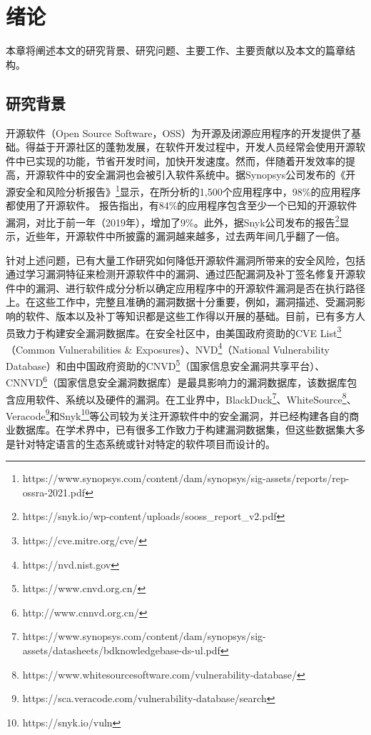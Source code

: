 \chapter{绪论}

本章将阐述本文的研究背景、研究问题、主要工作、主要贡献以及本文的篇章结构。

\section{研究背景}

开源软件（Open Source Software，OSS）为开源及闭源应用程序的开发提供了基础。得益于开源社区的蓬勃发展，在软件开发过程中，开发人员经常会使用开源软件中已实现的功能，节省开发时间，加快开发速度\cite{Wang2020empirical}。然而，伴随着开发效率的提高，开源软件中的安全漏洞也会被引入软件系统中\cite{2何熙巽2020软件供应链安全综述,3刘剑2018软件与网络安全研究综述}。据Synopsys公司发布的《开源安全和风险分析报告》\footnote{https://www.synopsys.com/content/dam/synopsys/sig-assets/reports/rep-ossra-2021.pdf}显示，在所分析的1,500个应用程序中，98\%的应用程序都使用了开源软件。
报告指出，有84\%的应用程序包含至少一个已知的开源软件漏洞，对比于前一年（2019年），增加了9\%。此外，据Snyk公司发布的报告\footnote{https://snyk.io/wp-content/uploads/sooss\_report\_v2.pdf}显示，近些年，开源软件中所披露的漏洞越来越多，过去两年间几乎翻了一倍。

针对上述问题，已有大量工作研究如何降低开源软件漏洞所带来的安全风险，包括通过学习漏洞特征来检测开源软件中的漏洞\cite{li2016vulpecker,li2018vuldeepecker,zhou2019devign,jimenez2019importance}、通过匹配漏洞及补丁签名\cite{jang2012redebug, kim2017vuddy, xu2020patch, xiao2020mvp, cui2020vuldetector}修复开源软件中的漏洞\cite{mulliner2013patchdroid, duan2019automating, xu2020automatic, machiry2020spider}、进行软件成分分析以确定应用程序中的开源软件漏洞是否在执行路径上\cite{pashchenko2018vulnerable, ponta2020detection, pashchenko2020vuln4real, Wang2020empirical}。在这些工作中，完整且准确的漏洞数据十分重要，例如，漏洞描述、受漏洞影响的软件、版本以及补丁等知识都是这些工作得以开展的基础。目前，已有多方人员致力于构建安全漏洞数据库。在安全社区中，由美国政府资助的CVE List\footnote{https://cve.mitre.org/cve/}（Common Vulnerabilities \& Exposures）、NVD\footnote{https://nvd.nist.gov}（National Vulnerability Database）和由中国政府资助的CNVD\footnote{https://www.cnvd.org.cn/}（国家信息安全漏洞共享平台）、CNNVD\footnote{http://www.cnnvd.org.cn/}（国家信息安全漏洞数据库）是最具影响力的漏洞数据库，该数据库包含应用软件、系统以及硬件的漏洞。在工业界中，BlackDuck\footnote{https://www.synopsys.com/content/dam/synopsys/sig-assets/datasheets/bdknowledgebase-ds-ul.pdf}、WhiteSource\footnote{https://www.whitesourcesoftware.com/vulnerability-database/}、Veracode\footnote{https://sca.veracode.com/vulnerability-database/search}和Snyk\footnote{https://snyk.io/vuln}等公司较为关注开源软件中的安全漏洞，并已经构建各自的商业数据库。在学术界中，已有很多工作致力于构建漏洞数据集\cite{ponta2019manually,fan2020ac,jimenez2018enabling,gkortzis2018vulinoss,namrud2019androvul}，但这些数据集大多是针对特定语言的生态系统或针对特定的软件项目而设计的。

